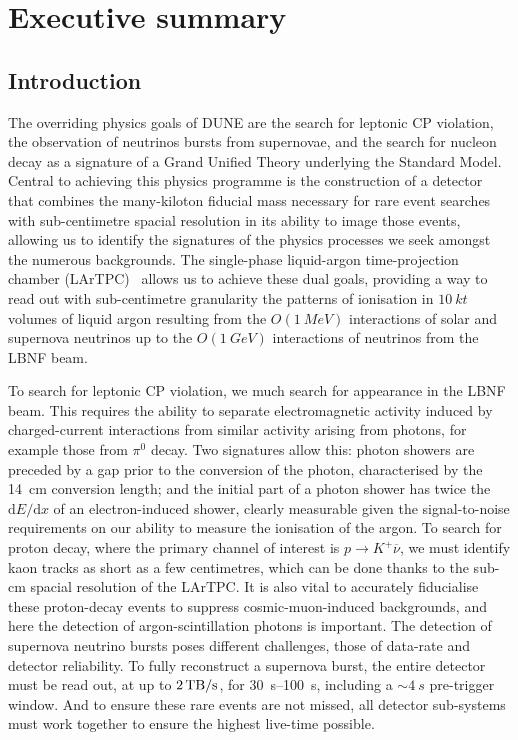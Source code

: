 \chapter{Executive summary}
\label{ch:fdsp-execsum}

\section{Introduction}
\label{sec:fdsp-exec-introduction}


The overriding physics goals of DUNE are the search for leptonic CP violation, the observation of neutrinos bursts from supernovae, and the search for nucleon decay as a signature of a Grand Unified Theory underlying the Standard Model. Central to achieving this physics programme is the construction of a detector that combines the many-kiloton fiducial mass necessary for rare event searches with sub-centimetre spacial resolution in its ability to image those events, allowing us to identify the signatures of the physics processes we seek amongst the numerous backgrounds. The single-phase liquid-argon time-projection chamber (LArTPC)~\cite{ref:RubbiaLartpc} allows us to achieve these dual goals, providing a way to read out with sub-centimetre granularity the patterns of ionisation in $\SI{10}{kt}$ volumes of liquid argon resulting from the $O(\SI{1}{MeV})$ interactions of solar and supernova neutrinos up to the $O(\SI{1}{GeV})$ interactions of neutrinos from the LBNF beam.

To search for leptonic CP violation, we much search for \nue appearance in the LBNF \numu beam. This requires the ability to separate electromagnetic activity induced by charged-current \nue interactions from similar activity arising from photons, for example those from $\pi^{0}$ decay. Two signatures allow this: photon showers are preceded by a gap prior to the conversion of the photon, characterised by the \SI{14}{cm} conversion length; and the initial part of a photon shower has twice the $\mathrm{d}E/\mathrm{d}x$ of an electron-induced shower, clearly measurable given the signal-to-noise requirements on our ability to measure the ionisation of the argon. To search for proton decay, where the primary channel of interest is $p\rightarrow K^{+}\overline{\nu}$, we must identify kaon tracks as short as a few centimetres, which can be done thanks to the sub-\si{cm} spacial resolution of the LArTPC. It is also vital to accurately fiducialise these proton-decay events to suppress cosmic-muon-induced backgrounds, and here the detection of argon-scintillation photons is important. The detection of supernova neutrino bursts poses different challenges, those of data-rate and detector reliability. To fully reconstruct a supernova burst, the entire detector must be read out, at up to $\SI{2}{\tera\byte/\second}$, for \SIrange{30}{100}{s}, including a $\sim\!\SI{4}{s}$ pre-trigger window. And to ensure these rare events are not missed, all detector sub-systems must work together to ensure the highest live-time possible.

